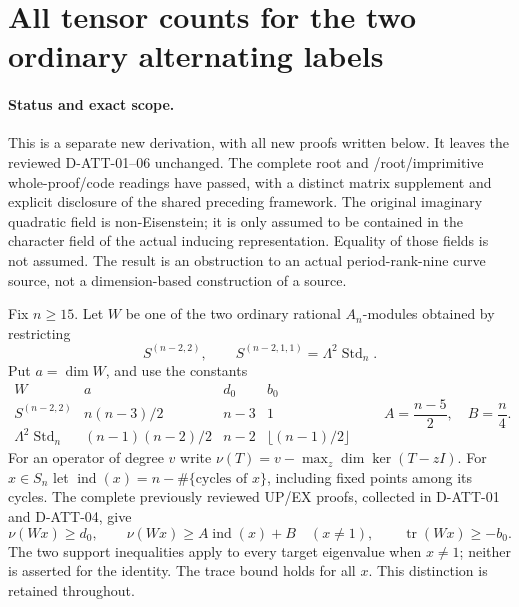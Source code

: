 \section{All tensor counts for the two ordinary alternating labels}
\label{sec:alternating-two-tail-all-tensors}

\paragraph{Status and exact scope.}
This is a separate new derivation, with all new proofs written below.
It leaves the reviewed D-ATT-01--06 unchanged.  The complete root and /root/imprimitive whole-proof/code
readings have passed, with a distinct matrix supplement and
explicit disclosure of the shared preceding framework.  The original imaginary quadratic field is non-Eisenstein;
it is only assumed to be contained in the character field of the
actual inducing representation.  Equality of those fields is not
assumed.  The result is an obstruction to an actual period-rank-nine
curve source, not a dimension-based construction of a source.

Fix $n\ge15$.  Let $W$ be one of the two ordinary rational
$A_n$-modules obtained by restricting
\[
 S^{(n-2,2)},\qquad S^{(n-2,1,1)}=\Lambda^2\operatorname{Std}_n.
 \tag{ATX.1}
\]
Put $a=\dim W$, and use the constants
\[
\begin{array}{c|c|c|c}
 W&a&d_0&b_0\\ \hline
 S^{(n-2,2)}&n(n-3)/2&n-3&1\\
 \Lambda^2\operatorname{Std}_n&(n-1)(n-2)/2&n-2&\lfloor(n-1)/2\rfloor
\end{array}
\qquad A=\frac{n-5}{2},\quad B=\frac n4.
\tag{ATX.2}
\]
For an operator of degree $v$ write
$\nu(T)=v-\max_z\dim\ker(T-zI)$.  For $x\in S_n$ let
$\operatorname{ind}(x)=n-\#\{\text{cycles of }x\}$, including fixed
points among its cycles.  The complete previously reviewed UP/EX
proofs, collected in D-ATT-01 and D-ATT-04, give
\[
 \nu(Wx)\ge d_0,\qquad
 \nu(Wx)\ge A\operatorname{ind}(x)+B\quad(x\ne1),
 \qquad \operatorname{tr}(Wx)\ge-b_0.
 \tag{ATX.3}
\]
The two support inequalities apply to every target eigenvalue
when $x\ne1$; neither is asserted for the identity.  The trace
bound holds for all $x$.  This distinction is retained throughout.

